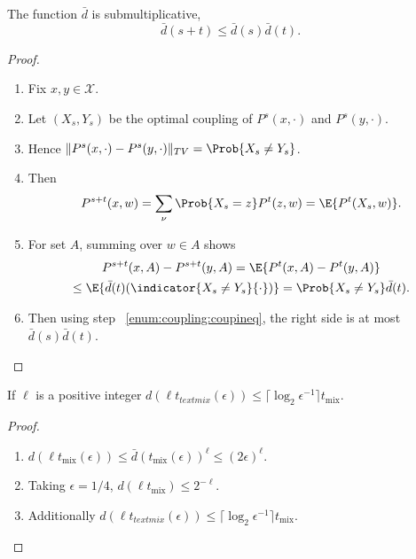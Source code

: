 \documentclass[12pt]{article}
\begin{document}
\begin{lemma}
    The function \( \bar{d} \) is submultiplicative,
    \[
        \bar{d}(s + t) \le \bar{d}(s) \bar{d}(t).
    \]
\end{lemma}

\begin{proof}
    \begin{enumerate}
        \item
            Fix \( x, y \in \mathcal{X} \).
        \item
            Let \( (X_s, Y_s) \) be the optimal coupling of \( P^s(x,
            \cdot) \) and \( P^s(y, \cdot) \).
        \item
            \label{enum:coupling:coupineq} Hence \( \| P^s(x,\cdot) - P^s
            (y,\cdot) \|_{TV} = \Prob{X_s \ne Y_s} \).
        \item
            Then
            \[
                P^{s+t}(x,w) = \sum_{\nu} \Prob{X_s = z}P^t(z,w) = \E{P^t
                (X_s, w)}.
            \]
        \item
            For set \( A \), summing over \( w \in A \) shows
            \begin{multline*}
                P^{s+t}(x,A) - P^{s+t}(y,A) = \E{P^t(x,A) - P^t(y,A)} \\
                \le \E{\bar{d}(t)(\indicator{X_s \ne Y_s}{\cdot})} =
                \Prob{X_s \ne Y_s} \bar{d}(t).
            \end{multline*}
        \item
            Then using step~%
            \ref{enum:coupling:coupineq}, the right side is at most \(
            \bar{d}(s) \bar{d}(t) \).
    \end{enumerate}
\end{proof}

\begin{corollary}
    If \( \ell \) is a positive integer \( d(\ell t_{text{mix}}(\epsilon))
    \le \lceil \log_{2} \epsilon^{-1} \rceil t_{\text{mix}} \).
\end{corollary}

\begin{proof}
    \begin{enumerate}
        \item
            \( d(\ell t_{\text{mix}}(\epsilon)) \le \bar{d}(t_{\text{mix}}
            (\epsilon))^{\ell} \le (2\epsilon)^{\ell} \).
        \item
            Taking \( \epsilon = 1/4 \), \( d(\ell t_{\text{mix}}) \le 2^
            {-\ell} \).
        \item
            Additionally \( d(\ell t_{text{mix}}(\epsilon)) \le \lceil
            \log_{2} \epsilon^{-1} \rceil t_{\text{mix}} \).
    \end{enumerate}
\end{proof}
\end{document}
